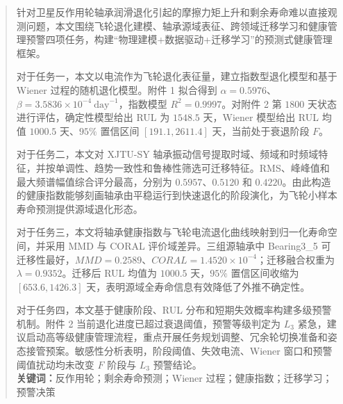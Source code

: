 \begin{abstract}\xiaosihao
    \vspace{0.1cm}
    针对卫星反作用轮轴承润滑退化引起的摩擦力矩上升和剩余寿命难以直接观测问题，本文围绕飞轮退化建模、轴承源域表征、跨领域迁移学习和健康管理预警四项任务，构建“物理建模+数据驱动+迁移学习”的预测式健康管理框架。\par
    对于任务一，本文以电流作为飞轮退化表征量，建立指数型退化模型和基于 Wiener 过程的随机退化模型。附件 1 拟合得到 $\alpha=0.5976$、$\beta=3.5836\times10^{-4}\ \mathrm{day}^{-1}$，指数模型 $R^2=0.9997$。对附件 2 第 $1800$ 天状态进行评估，确定性模型给出 RUL 为 $1548.5$ 天，Wiener 模型给出 RUL 均值 $1000.5$ 天、$95\%$ 置信区间 $[191.1,2611.4]$ 天，当前处于衰退阶段 $F$。\par
    对于任务二，本文对 XJTU-SY 轴承振动信号提取时域、频域和时频域特征，并按单调性、趋势一致性和鲁棒性筛选可迁移特征。RMS、峰峰值和最大频谱幅值综合评分最高，分别为 $0.5957$、$0.5120$ 和 $0.4220$。由此构造的健康指数能够刻画轴承由平稳运行到快速退化的阶段演化，为飞轮小样本寿命预测提供源域退化形态。\par
    对于任务三，本文将轴承健康指数与飞轮电流退化曲线映射到归一化寿命空间，并采用 MMD 与 CORAL 评价域差异。三组源轴承中 Bearing3\_5 可迁移性最好，$MMD=0.2589$、$CORAL=1.4520\times10^{-4}$；迁移融合权重为 $\lambda=0.9352$。迁移后 RUL 均值为 $1000.5$ 天，$95\%$ 置信区间收缩为 $[653.6,1426.3]$ 天，表明源域全寿命信息有效降低了外推不确定性。\par
    对于任务四，本文基于健康阶段、RUL 分布和短期失效概率构建多级预警机制。附件 2 当前退化进度已超过衰退阈值，预警等级判定为 $L_3$ 紧急，建议启动高等级健康管理流程，重点开展任务规划调整、冗余轮切换准备和姿态接管预案。敏感性分析表明，阶段阈值、失效电流、Wiener 窗口和预警阈值扰动均未改变 $F$ 阶段与 $L_3$ 预警结论。\\

    \textbf{关键词：}反作用轮；剩余寿命预测；Wiener 过程；健康指数；迁移学习；预警决策
\end{abstract}
